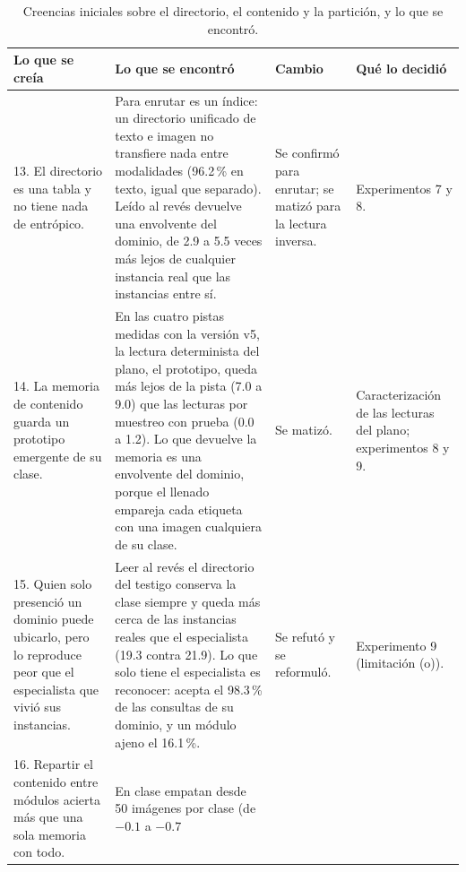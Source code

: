 \begin{table}[H]
    \centering
    \caption[Creencias iniciales: el directorio, el contenido y la partición]{Creencias
    iniciales sobre el directorio, el contenido y la partición, y lo que se encontró.}
    \label{fase:tab-creencias-directorio}
    \footnotesize
    \setlength{\tabcolsep}{3pt}
    \begin{tabular}{p{}p{}p{}p{}}
        \toprule
        Lo que se creía & Lo que se encontró & Cambio & Qué lo decidió \\
        \midrule
        \raggedright 13. El directorio es una tabla y no tiene nada de entrópico. &
        \raggedright Para enrutar es un índice: un directorio unificado de texto e imagen
        no transfiere nada entre modalidades (96.2\,\% en texto, igual que separado).
        Leído al revés devuelve una envolvente del dominio, de 2.9 a 5.5 veces más lejos
        de cualquier instancia real que las instancias entre sí. &
        \raggedright Se confirmó para enrutar; se matizó para la lectura inversa. &
        \raggedright Experimentos 7 y 8. \tabularnewline\addlinespace[4pt]
        \raggedright 14. La memoria de contenido guarda un prototipo emergente de su
        clase. &
        \raggedright En las cuatro pistas medidas con la versión v5, la lectura
        determinista del plano, el prototipo, queda más lejos de la pista (7.0 a 9.0)
        que las lecturas por muestreo con prueba (0.0 a 1.2). Lo que devuelve la memoria
        es una envolvente del dominio, porque el llenado empareja cada etiqueta con una
        imagen cualquiera de su clase. &
        \raggedright Se matizó. &
        \raggedright Caracterización de las lecturas del plano; experimentos 8 y 9.
        \tabularnewline\addlinespace[4pt]
        \raggedright 15. Quien solo presenció un dominio puede ubicarlo, pero lo
        reproduce peor que el especialista que vivió sus instancias. &
        \raggedright Leer al revés el directorio del testigo conserva la clase siempre y
        queda más cerca de las instancias reales que el especialista (19.3 contra 21.9).
        Lo que solo tiene el especialista es reconocer: acepta el 98.3\,\% de las
        consultas de su dominio, y un módulo ajeno el 16.1\,\%. &
        \raggedright Se refutó y se reformuló. &
        \raggedright Experimento 9 (limitación (o)). \tabularnewline\addlinespace[4pt]
        \raggedright 16. Repartir el contenido entre módulos acierta más que una sola
        memoria con todo. &
        \raggedright En clase empatan desde 50 imágenes por clase (de $-0.1$ a $-0.7$

\end{tabular}
\end{table}
